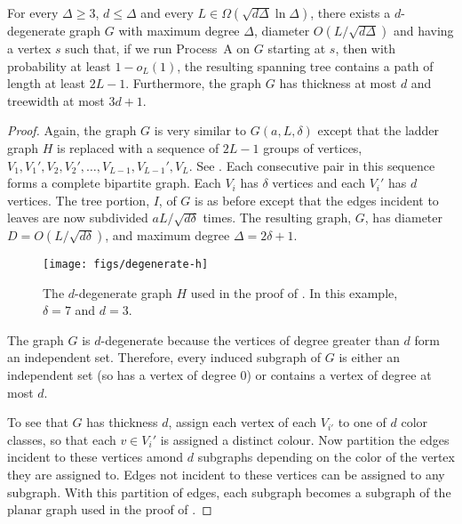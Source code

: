 \documentclass[lotsofwhite]{patmorin}
\begin{document}
\begin{thm}
  For every $\Delta\ge 3$, $d\le \Delta$ and every
  $L\in\Omega(\sqrt{d\Delta}\ln\Delta)$, there exists a $d$-degenerate
  graph $G$ with maximum degree $\Delta$, diameter $O(L/\sqrt{d\Delta})$
  and having a vertex $s$ such that, if we run Process~A on $G$ starting
  at $s$, then with probability at least $1-o_L(1)$, the resulting
  spanning tree contains a path of length at least $2L-1$. Furthermore,
  the graph $G$ has thickness at most $d$ and treewidth at most $3d+1$.
\end{thm}

\begin{proof}
  Again, the graph $G$ is very similar to $G(a, L,\delta)$ except that
  the ladder graph $H$ is replaced with a sequence of $2L-1$ groups
  of vertices, $V_{1},V_{1}',V_2,V_2',\ldots,V_{L-1},V_{L-1}',V_L$.
  See .  Each consecutive pair in this sequence
  forms a complete bipartite graph.  Each $V_i$ has $\delta$ vertices
  and each $V_i'$ has $d$ vertices.  The tree portion, $I$, of $G$ is
  as before except that the edges incident to leaves are now subdivided
  $aL/\sqrt{d\delta}$ times.  The resulting graph, $G$, has diameter
  $D=O(L/\sqrt{d\delta})$, and maximum degree $\Delta = 2\delta+1$.

  \begin{figure}
    \begin{center}
       \texttt{[image: figs/degenerate-h]}
    \end{center}
    \caption{The $d$-degenerate graph $H$ used in the proof of
       . In this example, $\delta=7$
        and $d=3$.}
  \end{figure}

  The graph $G$ is $d$-degenerate because the vertices of degree greater
  than $d$ form an independent set. Therefore, every induced subgraph
  of $G$ is either an independent set (so has a vertex of degree 0)
  or contains a vertex of degree at most $d$.

  To see that $G$ has thickness $d$, assign each vertex of each
  $V_{i'}$ to one of $d$ color classes, so that each $v\in V_i'$ is
  assigned a distinct colour.   Now partition the edges incident to
  these vertices amond $d$ subgraphs depending on the color of the
  vertex they are assigned to.  Edges not incident to these vertices
  can be assigned to any subgraph.  With this partition of edges, each
  subgraph becomes a subgraph of the planar graph used in the proof of
  .


\end{proof}
\end{document}
